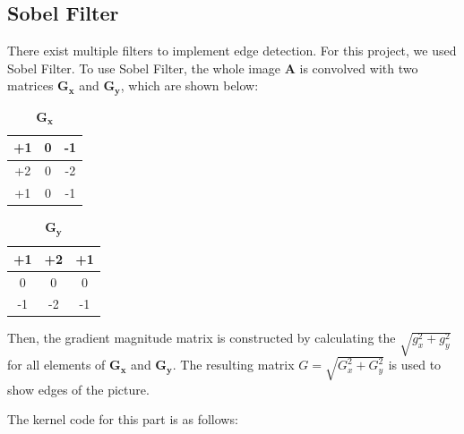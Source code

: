 \documentclass[12pt]{article}
\begin{document}
\newpage


\subsection{Sobel Filter}
There exist multiple filters to implement edge detection. For this project, we used Sobel Filter. To use Sobel Filter, the whole image $\mathbf{A}$ is convolved with two matrices $\mathbf{G_x}$ and $\mathbf{G_y}$, which are shown below:

\begin{table}[ht!]
	\centering
	\begin{tabular}{|c|c|c|}
		\hline
		+1 & 0 & -1 \\ \hline
		+2 & 0 &  -2 \\ \hline
		+1 & 0 & -1 \\ \hline
	\end{tabular}
	\cprotect\caption{$\mathbf{G_x}$}
\end{table}

\begin{table}[ht!]
	\centering
	\begin{tabular}{|c|c|c|}
		\hline
		+1 & +2 & +1 \\ \hline
		0 & 0 &  0 \\ \hline
		-1 & -2 & -1 \\ \hline
	\end{tabular}
	\cprotect\caption{$\mathbf{G_y}$}
\end{table}

Then, the gradient magnitude matrix is constructed by calculating the $\sqrt{g^2_x + g^2_y}$ for all elements of $\mathbf{G_x}$ and $\mathbf{G_y}$. The resulting matrix $G = \sqrt{G^2_x + G^2_y}$ is used to show edges of the picture.

The kernel code for this part is as follows:
\end{document}

